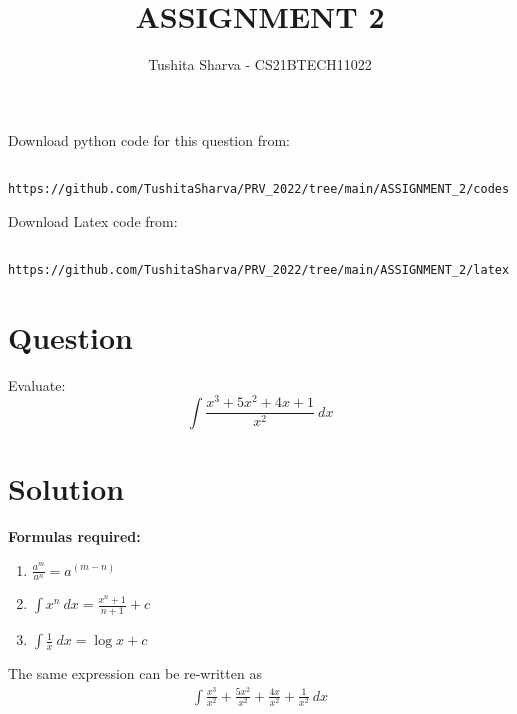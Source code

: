 \documentclass[journal,12pt,twocolumn]{IEEEtran}
\title{ASSIGNMENT 2}
\author{Tushita Sharva - CS21BTECH11022}
\numberwithin{equation}{subsection}
\begin{document}
\providecommand{\brak}[1]{\ensuremath{\left(#1\right)}}
\renewcommand\thesection{\arabic{section}}
\renewcommand\thesubsection{\thesection.\arabic{subsection}}
\renewcommand\thesubsubsection{\thesubsection.\arabic{subsubsection}}
\newcommand{\question}{\noindent \textbf{Question: }}
\newcommand{\solution}{\noindent \textbf{Solution: }}
\newcommand{\formulas}{\noindent \textbf{Formulas required:}}
\newcommand{\answer}{\noindent \textbf{Final Answer:}}

\maketitle

Download python code for this question from:

\begin{lstlisting}
  https://github.com/TushitaSharva/PRV_2022/tree/main/ASSIGNMENT_2/codes
\end{lstlisting}

Download Latex code from: 
\begin{lstlisting}
    https://github.com/TushitaSharva/PRV_2022/tree/main/ASSIGNMENT_2/latex
\end{lstlisting}
\bigskip

\section{Question}
Evaluate: $$\int \frac{x^3 + 5x^2 + 4x + 1}{x^2}\ dx$$
\bigskip

\section{Solution}

\bigskip

\formulas
\begin{enumerate}
    \item $ \frac{a^m}{a^n} = a^\brak{m-n}$ \label{eq:1} \\
    \item $\int x^n\ dx = \frac{x^n+1}{n+1} + c$ \label{eq:2}\\
    \item $\int \frac{1}{x}\ dx = \log x + c$ \label{eq:3}\\
\end{enumerate}

\bigskip

The same expression can be re-written as 
\begin{align}
    \int \frac{x^3}{x^2} + \frac{5x^2}{x^2} + \frac{4x}{x^2} + \frac{1}{x^2}\ dx
\end{align}
\end{document}
